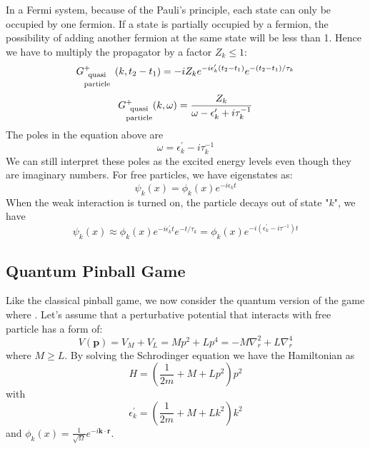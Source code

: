 In a Fermi system, because of the Pauli's principle, each state can only be occupied by one fermion. If a state is partially occupied by a fermion, the possibility of adding another fermion at the same state will be less than 1. Hence we have to multiply the propagator by a factor $Z_k\leq 1$:
\begin{equation}G_{\text {\stackanchor{quasi}{particle} }}^{+}\left(k,t_{2}-t_{1}\right)=-i Z_{k} e^{-i \epsilon_{k}^{\prime}\left(t_{2}-t_{1}\right)} e^{-\left(t_{2}-t_{1}\right) / \tau_{k}}\end{equation}
\begin{equation}G_{\text {\stackanchor{quasi}{particle}}}^{+}(k, \omega)=\frac{Z_{k}}{\omega-\epsilon_{k}^{\prime}+i \tau_{k}^{-1}}\end{equation}
The poles in the equation above are 
\begin{equation}
    \omega = \epsilon_k^{\prime}-i\tau_k^{-1}
\end{equation}
We can still interpret these poles as the excited energy levels even though they are imaginary numbers. For free particles, we have eigenstates as:
$$
\psi_k(x)=\phi_k(x)e^{-i\epsilon_k t}
$$
When the weak interaction is turned on, the particle decays out of state "$k$", we have
$$
\psi_k(x)\approx\phi_k(x)e^{-i\epsilon_k^{\prime} t}e^{-t/\tau_k}=\phi_k(x)e^{-i(\epsilon_k^{\prime}-i\tau^{-1})t}
$$

\subsection{Quantum Pinball Game}
Like the classical pinball game, we now consider the quantum version of the game where . Let's assume that a perturbative potential that interacts with free particle has a form of:
\begin{equation}V(\mathbf{p})=V_{M}+V_{L}=M p^{2}+L p^{4}=-M \nabla_{r}^{2}+L \nabla_{r}^{4}\end{equation}
where $M \geqslant L$. By solving the Schrodinger equation we have the Hamiltonian as
$$
H = (\frac{1}{2m}+M+Lp^2)p^2
$$
with 
$$
\epsilon_k^{\prime}= (\frac{1}{2m}+M+Lk^2)k^2
$$
and $\phi_k(x)=\frac{1}{\sqrt{\Omega}}e^{-i\mathbf{k}\cdot\mathbf{r}}$.

